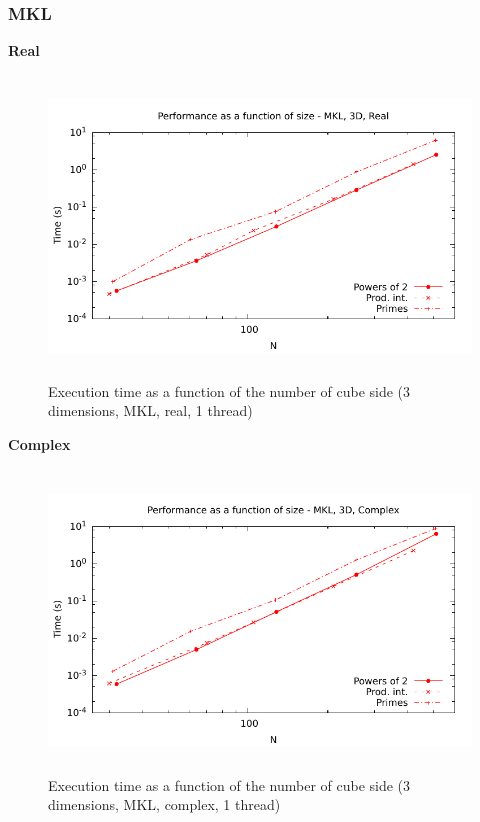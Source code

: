 \documentclass[12pt, a4paper]{article}
\begin{document}
\subsubsection{MKL}
{\bf Real}
\begin{figure}[H]
\captionsetup{width=0.6\textwidth}
\centering
\includegraphics[height=8cm]{graphs/performance/3d-mkl-r.pdf}
\caption{Execution time as a function of the number of cube side (3 dimensions, MKL, real, 1 thread)}
\label{3DMKLR}
\end{figure}
{\bf Complex}
\begin{figure}[H]
\captionsetup{width=0.6\textwidth}
\centering
\includegraphics[height=8cm]{graphs/performance/3d-mkl-c.pdf}
\caption{Execution time as a function of the number of cube side (3 dimensions, MKL, complex, 1 thread)}
\label{3DMKLC}
\end{figure}
\end{document}
